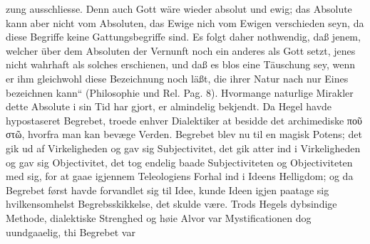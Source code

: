 \documentclass[12pt]{book}
\begin{document}
zung ausschliesse. Denn auch Gott wäre wieder absolut und ewig; das Absolute kann aber
nicht vom Absoluten, das Ewige nich vom Ewigen verschieden seyn, da diese Begriffe keine
Gattungsbegriffe sind. Es folgt daher nothwendig, daß jenem, welcher über dem Absoluten
der Vernunft noch ein anderes als Gott setzt, jenes nicht wahrhaft als solches
erschienen, und daß es blos eine Täuschung sey, wenn er ihm gleichwohl diese Bezeichnung
noch läßt, die ihrer Natur nach nur Eines bezeichnen kann“ (Philosophie und Rel. Pag. 8).
%
Hvormange naturlige Mirakler dette Absolute i sin Tid har gjort, er almindelig bekjendt.
Da Hegel havde hypostaseret Begrebet, troede enhver Dialektiker at besidde det
archimediske ποῦ στῶ, hvorfra man kan bevæge Verden. Begrebet blev nu til en magisk
Potens; det gik ud af Virkeligheden og gav sig Subjectivitet, det gik atter ind i
Virkeligheden og gav sig Objectivitet, det tog endelig baade Subjectiviteten og
Objectiviteten med sig, for at gaae igjennem Teleologiens Forhal ind i Ideens Helligdom;
og da Begrebet først havde forvandlet sig til Idee, kunde Ideen igjen paatage sig
hvilkensomhelst Begrebsskikkelse, det skulde være. Trods Hegels dybsindige Methode,
dialektiske Strenghed og høie Alvor var Mystificationen dog uundgaaelig, thi Begrebet var
\end{document}
